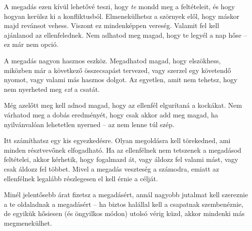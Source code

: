 A megadás ezen kívül lehetővé teszi, hogy \emph{te} mondd meg a feltételeit, és hogy hogyan kerülsz ki a konfliktusból. Elmenekülhetsz a szörnyek elől, hogy máskor majd revánsot vehess. Viszont ez mindenképpen vereség. Valamit fel kell ajánlanod az ellenfelednek. Nem adhatod meg magad, hogy te legyél a nap hőse – ez már nem opció.

A megadás nagyon hasznos eszköz. Megadhatod magad, hogy elszökhess, miközben már a következő összecsapást tervezed, vagy szerzel egy követendő nyomot, vagy valami más hasznos dolgot. Az egyetlen, amit nem tehetsz, hogy nem nyerheted meg \emph{ezt} a csatát.

Még azelőtt meg kell adnod magad, hogy az ellenfél elgurítaná a kockákat. Nem várhatod meg a dobás eredményét, hogy csak akkor add meg magad, ha nyilvánvalóan lehetetlen nyerned – az nem lenne túl szép.

Itt számíthatsz egy kis egyezkedésre. Olyan megoldásra kell törekedned, ami minden résztvevőnek elfogadható. Ha az ellenfélnek nem tetszenek a megadásod feltételei, akkor kérhetik, hogy fogalmazd át, vagy áldozz fel valami mást, vagy csak áldozz fel többet. Mivel a megadás veszteség a számodra, emiatt az ellenfélnek legalább részlegesen el kell érnie a célját.

Minél jelentősebb árat fizetsz a megadásért, annál nagyobb jutalmat kell szereznie a te oldaladnak a megadásért – ha biztos halállal kell a csapatnak szembenéznie, de egyikük hősiesen (és öngyilkos módon) utolsó vérig küzd, akkor mindenki más megmenekülhet.
